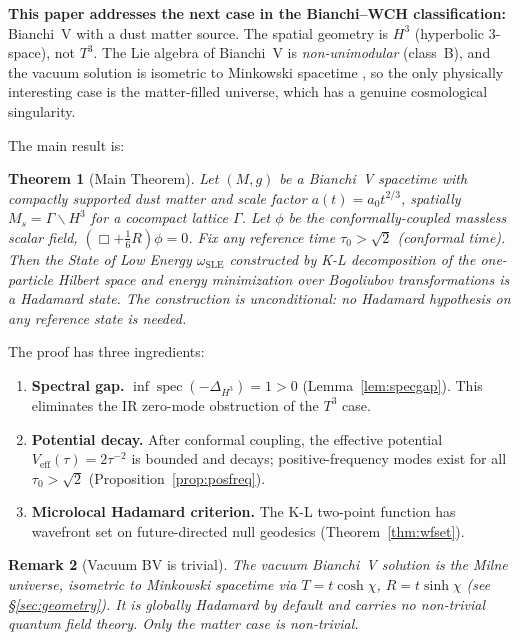 \documentclass[12pt,letterpaper]{article}
\newtheorem{theorem}{Theorem}[section]
\newtheorem{remark}[theorem]{Remark}
\newcommand{\SLE}{\mathrm{SLE}}
\DeclareMathOperator{\spec}{spec}
\begin{document}
\textbf{This paper addresses the next case in the Bianchi--WCH classification:}
Bianchi~V with a dust matter source.
The spatial geometry is $H^3$ (hyperbolic $3$-space), not $T^3$.
The Lie algebra of Bianchi~V is \emph{non-unimodular} (class~B), and the
vacuum solution is isometric to Minkowski spacetime \cite{Ellis-MacCallum69},
so the only physically interesting case is the matter-filled universe,
which has a genuine cosmological singularity.

The main result is:

\begin{theorem}[Main Theorem]
\label{thm:main}
Let $(M,g)$ be a Bianchi~V spacetime with compactly supported dust matter
and scale factor $a(t) = a_0 t^{2/3}$, spatially
$M_s = \Gamma \backslash H^3$ for a cocompact lattice $\Gamma$.
Let $\phi$ be the conformally-coupled massless scalar field,
$(\Box + \tfrac{1}{6}R)\phi = 0$.
Fix any reference time $\tau_0 > \sqrt{2}$ (conformal time).
Then the State of Low Energy $\omega_{\SLE}$ constructed by
K-L decomposition of the one-particle Hilbert space
and energy minimization over Bogoliubov transformations
is a Hadamard state.
The construction is \emph{unconditional}: no Hadamard hypothesis
on any reference state is needed.
\end{theorem}

The proof has three ingredients:
\begin{enumerate}
  \item[(A)] \textbf{Spectral gap.} $\inf\spec(-\Delta_{H^3}) = 1 > 0$
    (Lemma~\ref{lem:specgap}).
    This eliminates the IR zero-mode obstruction of the $T^3$ case.
  \item[(B)] \textbf{Potential decay.} After conformal coupling,
    the effective potential $V_{\mathrm{eff}}(\tau) = 2\tau^{-2}$
    is bounded and decays; positive-frequency modes exist for all
    $\tau_0 > \sqrt{2}$ (Proposition~\ref{prop:posfreq}).
  \item[(C)] \textbf{Microlocal Hadamard criterion.} The K-L two-point
    function has wavefront set on future-directed null geodesics
    (Theorem~\ref{thm:wfset}).
\end{enumerate}

\begin{remark}[Vacuum BV is trivial]
The vacuum Bianchi~V solution is the Milne universe, isometric to
Minkowski spacetime via $T = t\cosh\chi$, $R = t\sinh\chi$
(see \S\ref{sec:geometry}).
It is globally Hadamard by default and carries no non-trivial
quantum field theory.
Only the matter case is non-trivial.
\end{remark}
\end{document}
